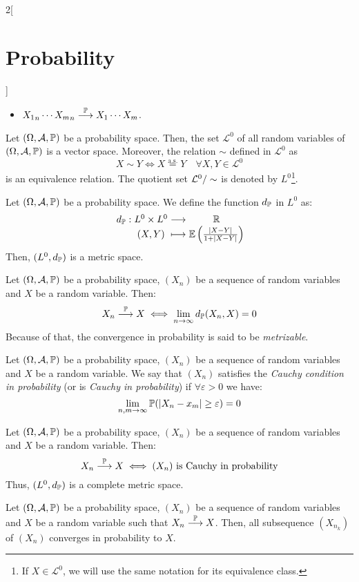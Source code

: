 \documentclass[../../../main.tex]{subfiles}
\begin{document}
\begin{multicols}{2}[\section{Probability}]
\begin{corollary}
\begin{itemize}
            \item ${X_1}_n\cdots{X_m}_n\overset{\mathbb{P}}{\longrightarrow}X_1\cdots X_m$.
        \end{itemize}
    \end{corollary}
    \begin{lemma}
        Let $(\Omega,\mathcal{A},\mathbb{P})$ be a probability space. Then, the set $\mathcal{L}^0$ of all random variables of $(\Omega,\mathcal{A},\mathbb{P})$ is a vector space. Moreover, the relation $\sim$ defined in $\mathcal{L}^0$ as $$X\sim Y\iff X\overset{\text{a.s.}}{=} Y\quad\forall X,Y\in\mathcal{L}^0$$ is an equivalence relation. The quotient set $\quot{\mathcal{L}^0}{\sim}$ is denoted by $L^0$\footnote{If $X\in\mathcal{L}^0$, we will use the same notation for its equivalence class.}.
    \end{lemma}
    \begin{prop}
        Let $(\Omega,\mathcal{A},\mathbb{P})$ be a probability space. We define the function $d_{\mathbb{P}}$ in $L^0$ as:
        $$\function{d_\Prob}{L^0\times L^0}{\RR}{(X,Y)}{\Exp\left(\frac{|X-Y|}{1+|X-Y|}\right)}$$
        Then, $(L^0,d_{\mathbb{P}})$ is a metric space.
    \end{prop}
    \begin{prop}
        Let $(\Omega,\mathcal{A},\mathbb{P})$ be a probability space, $(X_n)$ be a sequence of random variables and $X$ be a random variable. Then:
        $$X_n\overset{\mathbb{P}}{\longrightarrow} X\iff\lim_{n\to\infty} d_{\mathbb{P}}(X_n,X)=0$$
        Because of that, the convergence in probability is said to be \textit{metrizable}.
    \end{prop}
    \begin{definition}
        Let $(\Omega,\mathcal{A},\mathbb{P})$ be a probability space, $(X_n)$ be a sequence of random variables and $X$ be a random variable. We say that $(X_n)$ satisfies the \textit{Cauchy condition in probability} (or is \textit{Cauchy in probability}) if $\forall \varepsilon >0$ we have: $$\lim_{n,m\to\infty}\mathbb{P}(|X_n-x_m|\geq \varepsilon)=0$$
    \end{definition}
    \begin{prop}
        Let $(\Omega,\mathcal{A},\mathbb{P})$ be a probability space, $(X_n)$ be a sequence of random variables and $X$ be a random variable. Then:
        $$X_n\overset{\mathbb{P}}{\longrightarrow} X\iff(X_n)\text{ is Cauchy in probability}$$
        Thus, $(L^0,d_{\mathbb{P}})$ is a complete metric space.
    \end{prop}
    \begin{prop}
        Let $(\Omega,\mathcal{A},\mathbb{P})$ be a probability space, $(X_n)$ be a sequence of random variables and $X$ be a random variable such that $X_n\overset{\mathbb{P}}{\longrightarrow} X$. Then, all subsequence $(X_{n_k})$ of $(X_n)$ converges in probability to $X$.
    \end{prop}

\end{multicols}
\end{document}

